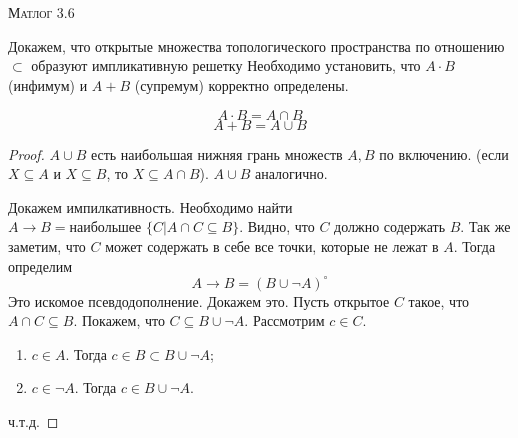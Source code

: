 \documentclass[10pt]{article}
\begin{document}
\def\chap#1#2{\ \\ {\large\bf#1 \ | \ \tt\scshape#2} \par}

\ \vspace{-1cm}

{\bf
\ \\
\Large\centerline{\scshape Матлог 3.6}
}\normalsize

Докажем, что открытые множества топологического пространства по отношению $\subset$ образуют импликативную решетку
Необходимо установить, что $A \cdot B$ (инфимум) и $A + B$ (супремум) корректно определены.

\[ A \cdot B = A\cap B\]
\[ A + B = A \cup B \]

\begin{proof}
    $A\cup B$ есть наибольшая нижняя грань множеств $A,B$ по включению.
    (если $X\subseteq A$ и $X \subseteq B$, то $X \subseteq A\cap B$).
    $A \cup B$ аналогично.  

    Докажем импилкативность.
    Необходимо найти $A\to B = \text{наибольшее } \{ C| A\cap C \subseteq B\}$. 
    Видно, что $C$ должно содержать $B$. 
    Так же заметим, что $C$ может содержать в себе все точки, которые не лежат в $A$.
    Тогда определим \[A\to B = (B \cup \neg A)^\circ \]
    Это искомое псевдодополнение. 
    Докажем это. 
    Пусть открытое $C$ такое, что $A\cap C \subseteq B$. 
    Покажем, что $C \subseteq B \cup \neg A$.
    Рассмотрим $c\in C$. 
    \begin{enumerate}
        \item $c\in A$. Тогда $c\in B \subset B\cup \neg A$;
        \item $c \in \neg A$. Тогда $c \in B \cup \neg A$.
    \end{enumerate}
    ч.т.д.

    
\end{proof}
\end{document}

